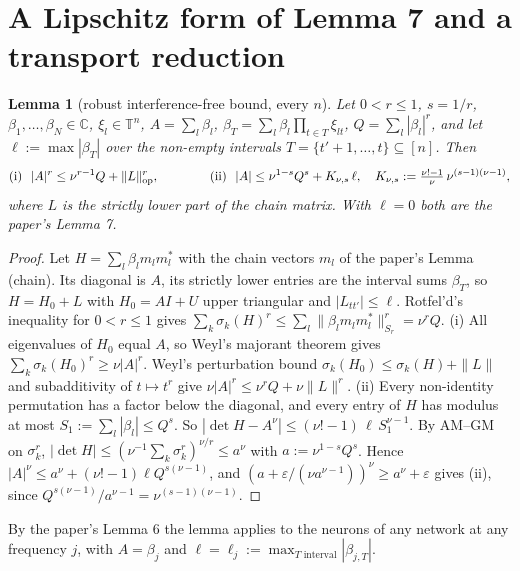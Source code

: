 \documentclass[11pt]{article}
\newtheorem{lemma}[theorem]{Lemma}
\theoremstyle{definition}
\begin{document}
\section{A Lipschitz form of Lemma 7 and a transport reduction}\label{sec:robust}
\begin{lemma}[robust interference-free bound, every $n$]\label{lem:robust}
Let $0<r\le1$, $s=1/r$, $\beta_1,\dots,\beta_N\in\mathbb C$, $\xi_l\in\mathbb T^n$, $A=\sum_l\beta_l$,
$\beta_T=\sum_l\beta_l\prod_{t\in T}\xi_{lt}$, $Q=\sum_l|\beta_l|^r$, and let $\ell:=\max|\beta_T|$ over the non-empty
\emph{intervals} $T=\{t'+1,\dots,t\}\subseteq[n]$.  Then
\[\text{(i)}\ \ |A|^r\le\nu^{r-1}Q+\|L\|_{\rm op}^r,\qquad\qquad
\text{(ii)}\ \ |A|\le\nu^{1-s}Q^s+K_{\nu,s}\,\ell,\quad K_{\nu,s}:=\tfrac{\nu!-1}{\nu}\,\nu^{(s-1)(\nu-1)},\]
where $L$ is the strictly lower part of the chain matrix.  With $\ell=0$ both are the paper's Lemma 7.
\end{lemma}
\begin{proof}
Let $H=\sum_l\beta_lm_lm_l^*$ with the chain vectors $m_l$ of the paper's Lemma (chain).  Its diagonal is $A$, its
strictly lower entries are the interval sums $\beta_T$, so $H=H_0+L$ with $H_0=AI+U$ upper triangular and
$|L_{tt'}|\le\ell$.  Rotfel'd's inequality for $0<r\le1$ gives $\sum_k\sigma_k(H)^r\le\sum_l\|\beta_lm_lm_l^*\|_{S_r}^r=\nu^rQ$.
(i) All eigenvalues of $H_0$ equal $A$, so Weyl's majorant theorem gives $\sum_k\sigma_k(H_0)^r\ge\nu|A|^r$.  Weyl's
perturbation bound $\sigma_k(H_0)\le\sigma_k(H)+\|L\|$ and subadditivity of $t\mapsto t^r$ give
$\nu|A|^r\le\nu^rQ+\nu\|L\|^r$.
(ii) Every non-identity permutation has a factor below the diagonal, and every entry of $H$ has modulus at most
$S_1:=\sum_l|\beta_l|\le Q^s$.  So $|\det H-A^\nu|\le(\nu!-1)\,\ell\,S_1^{\nu-1}$.  By AM--GM on $\sigma_k^r$,
$|\det H|\le(\nu^{-1}\sum_k\sigma_k^r)^{\nu/r}\le a^\nu$ with $a:=\nu^{1-s}Q^s$.  Hence
$|A|^\nu\le a^\nu+(\nu!-1)\ell Q^{s(\nu-1)}$, and $(a+\varepsilon/(\nu a^{\nu-1}))^\nu\ge a^\nu+\varepsilon$ gives (ii), since
$Q^{s(\nu-1)}/a^{\nu-1}=\nu^{(s-1)(\nu-1)}$.
\end{proof}
By the paper's Lemma 6 the lemma applies to the neurons of any network at any frequency $j$, with $A=\beta_j$ and
$\ell=\ell_j:=\max_{T\text{ interval}}|\beta_{j,T}|$.
\end{document}
